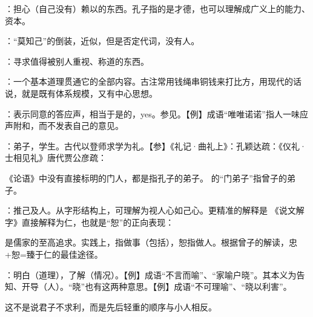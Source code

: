 {
\item {}：担心（自己没有）赖以的东西。孔子指的是才德，也可以理解成广义上的能力、资本。
\item {}：“莫知己”的倒装，近似，但是否定代词，没有人。
\item {}：寻求值得被别人重视、称道的东西。
}
{}


{
\begin{lyitemize}
\item {}：一个基本道理贯通它的全部内容。古注常用钱绳串铜钱来打比方，用现代的话说，就是既有体系规模，又有中心思想。
\item {}：表示同意的答应声，相当于是的，yes。参见。【例】成语“唯唯诺诺”指人一味应声附和，而不发表自己的意见。
\item {}：弟子，学生。古代以登师求学为礼。【参】《礼记·曲礼上》：孔颖达疏：《仪礼·士相见礼》唐代贾公彦疏：

《论语》中没有直接标明的门人，都是指孔子的弟子。 的“门弟子”指曾子的弟子。
\item {}：推己及人。从字形结构上，可理解为视人心如己心。更精准的解释是  《说文解字》直接解释为仁，也就是“恕”的正向表现： 
\end{lyitemize}
是儒家的至高追求。实践上，指做事（包括），恕指做人。根据曾子的解读，忠+恕=臻于仁的最佳途径。
}
{
} %


{
\item {}：明白（道理），了解（情况）。【例】成语“不言而喻”、“家喻户晓”。其本义为告知、开导（人）。“晓”也有这两种意思。【例】成语“不可理喻”、“晓以利害”。

这不是说君子不求利，而是先后轻重的顺序与小人相反。
}
{}


